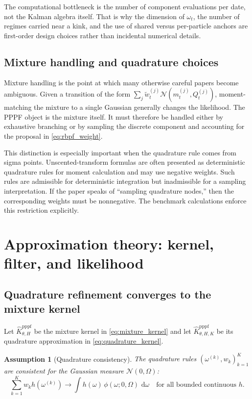 \documentclass[11pt]{article}
\newtheorem{assumption}{Assumption}
\theoremstyle{remark}
\newcommand{\dd}{\,\mathrm{d}}
\begin{document}
The computational bottleneck is the number of component evaluations per date, not the Kalman algebra itself.
That is why the dimension of $\omega_t$, the number of regimes carried near a kink, and the use of shared versus per-particle anchors are first-order design choices rather than incidental numerical details.

\subsection{Mixture handling and quadrature choices}

Mixture handling is the point at which many otherwise careful papers become ambiguous.
Given a transition of the form $\sum_j \tilde w_t^{(j)}\mathcal{N}(m_t^{(j)},Q_t^{(j)})$, moment-matching the mixture to a single Gaussian generally changes the likelihood.
The PPPF object is the mixture itself.
It must therefore be handled either by exhaustive branching or by sampling the discrete component and accounting for the proposal in \eqref{eq:rbpf_weight}.

This distinction is especially important when the quadrature rule comes from sigma points.
Unscented-transform formulas are often presented as deterministic quadrature rules for moment calculation and may use negative weights.
Such rules are admissible for deterministic integration but inadmissible for a sampling interpretation.
If the paper speaks of ``sampling quadrature nodes,'' then the corresponding weights must be nonnegative.
The benchmark calculations enforce this restriction explicitly.

\section{Approximation theory: kernel, filter, and likelihood}
\label{sec:theory}

\subsection{Quadrature refinement converges to the mixture kernel}

Let $\widehat K_{\theta,H}^{\mathrm{pppf}}$ be the mixture kernel in \eqref{eq:mixture_kernel} and let $\widehat K_{\theta,H,K}^{\mathrm{pppf}}$ be its quadrature approximation in \eqref{eq:quadrature_kernel}.

\begin{assumption}[Quadrature consistency]
The quadrature rules $(\omega^{(k)},w_k)_{k=1}^K$ are consistent for the Gaussian measure $\mathcal{N}(0,\Omega)$:
\[
\sum_{k=1}^K w_k h(\omega^{(k)}) \to \int h(\omega)\,\phi(\omega;0,\Omega)\,\dd\omega
\quad \text{for all bounded continuous } h.
\]
\end{assumption}
\end{document}
